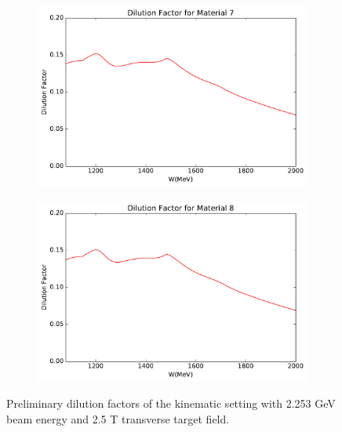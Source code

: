 \begin{figure}[p!]
  \centering
  \begin{subfigure}[t]{0.49\textwidth}
    \includegraphics[width=\textwidth]{figs/dilution-22532590-7.pdf}
  \end{subfigure}
  \begin{subfigure}[t]{0.49\textwidth}
    \includegraphics[width=\textwidth]{figs/dilution-22532590-8.pdf}
  \end{subfigure}
  \caption[Dilution factors with $E=2.253$ GeV and $B=2.5$ T.]{Preliminary dilution factors of the kinematic setting with 2.253 GeV beam energy and 2.5 T transverse target field. \label{C7S4F3}}
\end{figure}

